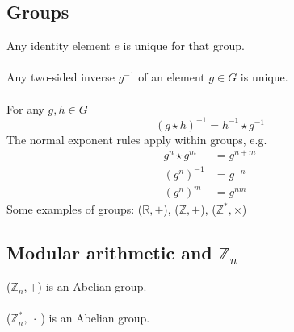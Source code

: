 \documentclass{scrartcl}
\newcommand{\R}{\mathbb{R}}
\newcommand{\Z}{\mathbb{Z}}
\begin{document}
\subsection{Groups}
Any identity element $ e $ is unique for that group.
\\\\
Any two-sided inverse $ g^{-1} $ of an element $ g \in G $ is unique.
\\\\
For any $g, h \in G $
\begin{equation}
(g \star h)^{-1} = h^{-1} \star g^{-1}
\end{equation}
The normal exponent rules apply within groups, e.g.
\begin{align}
g^{n} \star g^{m} & = g^{n+m} \\
(g^{n})^{-1} & = g^{-n} \\
(g^{n})^{m} & = g^{nm}
\end{align}
Some examples of groups:
($ \R, + $), ($ \Z, + $), ($ \Z^{*}, \times $)


\subsection{Modular arithmetic and $ \Z_{n} $}
($ \Z_{n}, + $) is an Abelian group.
\\\\
($ \Z_{n}^{*}, \ \cdot \ $) is an Abelian group.
\end{document}
